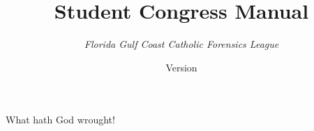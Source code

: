 \documentclass[11pt,letterpaper]{article}
\title{\Huge \textbf{Student Congress Manual}}
\author{\LARGE \emph{Florida Gulf Coast Catholic Forensics League}\vspace{.125in}}
\date{\Large Version \vv}
\begin{document}
\thispagestyle{empty}
\maketitle
\newpage
What hath God wrought!
\end{document}
